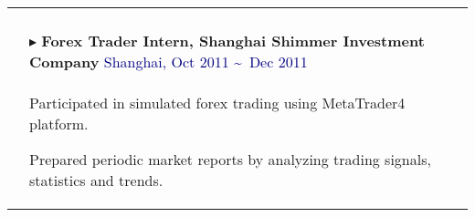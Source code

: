 \documentclass[$if(fontsize)$$fontsize$,$endif$$if(lang)$$babel-lang$,$endif$$if(papersize)$$papersize$paper,$endif$$for(classoption)$$classoption$$sep$,$endfor$]{$documentclass$}
\renewenvironment{itemize}{
  \begin{list}{}{
    \setlength{\leftmargin}{1em}  %
  }
}{
  \end{list}
}
\begin{document}
\begin{tabular}{>{\centering}p{2.5cm}|p{16.5cm}}
\begin{itemize}
      \vspace{-4mm}
      \end{itemize}\\
    & \vspace{-3mm}
    \(\blacktriangleright\) \textbf{Forex Trader Intern, Shanghai Shimmer Investment Company} \hfill \textcolor{Navy}{Shanghai, Oct 2011 \textasciitilde\ Dec 2011}\\
    & \vspace{-2mm}
      \begin{itemize}
        \item[\textbullet] Participated in simulated forex trading using MetaTrader4 platform.
        \item[\textbullet] Prepared periodic market reports by analyzing trading signals, statistics and trends.
      \vspace{-4mm}
      \end{itemize}\\

    \midrule
\end{tabular}

\newpage
\end{document}
